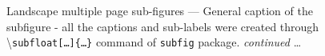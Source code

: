 \documentclass[phd,showgrids]{ndsu-thesis-2022}
\newcommand\cmd[1]{\textbackslash\texttt{#1}}  %
\begin{document}
\begin{landscape}
\begin{figure}[p]
\\
\hspace{0.5in}
\hspace{0.5in}
\hspace{0.5in}
\hspace{0.5in}
\\
\captionsetup{singlelinecheck=false} %
\caption{Landscape multiple page sub-figures --- General caption of the subfigure - all the captions and sub-labels were created through \cmd{subfloat[\ldots]\{\ldots\}} command of \texttt{subfig} package. \emph{continued} \ldots} \label{fig:1gen}
\end{figure}
\clearpage


\end{landscape}
\end{document}
